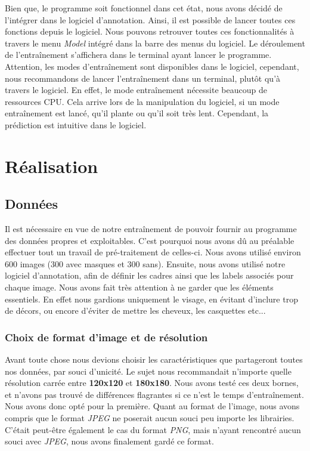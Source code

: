 \documentclass{rapport}
\begin{document}
           Bien que, le programme soit fonctionnel dans cet état, nous avons décidé de l'intégrer dans le logiciel d'annotation. Ainsi, il est possible de lancer toutes ces fonctions depuis le logiciel. Nous pouvons retrouver toutes ces fonctionnalités à travers le menu \textit{Model} intégré dans la barre des menus du logiciel. Le déroulement de l'entraînement s'affichera dans le terminal ayant lancer le programme. Attention, les modes d'entraînement sont disponibles dans le logiciel, cependant, nous recommandons de lancer l'entraînement dans un terminal, plutôt qu'à travers le logiciel. En effet, le mode entraînement nécessite beaucoup de ressources CPU. Cela arrive lors de la manipulation du logiciel, si un mode entraînement est lancé, qu'il plante ou qu'il soit très lent. Cependant, la prédiction est intuitive dans le logiciel.
            
        
    \section{Réalisation}
    
        \subsection{Données}
        Il est nécessaire en vue de notre entraînement de pouvoir fournir au programme des données propres et exploitables. C'est pourquoi nous avons dû au préalable effectuer tout un travail de pré-traitement de celles-ci. Nous avons utilisé environ 600 images (300 avec masques et 300 sans). Ensuite, nous avons utilisé notre logiciel d'annotation, afin de définir les cadres ainsi que les labels associés pour chaque image. Nous avons fait très attention à ne garder que les éléments essentiels. En effet nous gardions uniquement le visage, en évitant d'inclure trop de décors, ou encore d'éviter de mettre les cheveux, les casquettes etc...
        
            
            \subsubsection{Choix de format d'image et de résolution}
            Avant toute chose nous devions choisir les caractéristiques que partageront toutes nos données, par souci d'unicité. Le sujet nous recommandait n'importe quelle résolution carrée entre \textbf{120x120} et \textbf{180x180}.
            Nous avons testé ces deux bornes, et n'avons pas trouvé de différences flagrantes si ce n'est le temps d'entraînement. Nous avons donc opté pour la première. Quant au format de l'image, nous avons compris que le format \textit{JPEG} ne poserait aucun souci peu importe les librairies. C'était peut-être également le cas du format \textit{PNG}, mais n'ayant rencontré aucun souci avec \textit{JPEG}, nous avons finalement gardé ce format.
            
\end{document}
